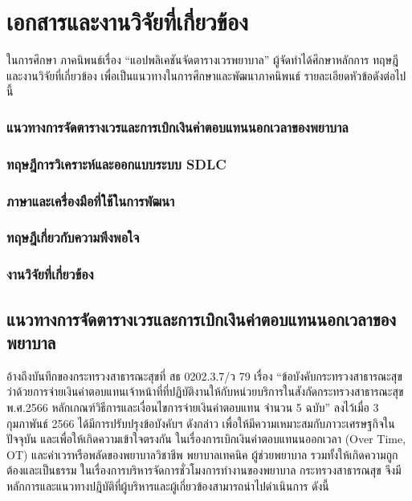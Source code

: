 \baselineskip=8mm
\chapter{เอกสารและงานวิจัยที่เกี่ยวข้อง}

\renewcommand{\thesubsection}{\arabic{subsection}.}
\renewcommand{\theequation}{\thesection.\arabic{equation}}
\renewcommand{\thesection}{}



ในการศึกษา ภาคนิพนธ์เรื่อง “แอปพลิเคชันจัดตารางเวรพยาบาล” ผู้จัดทำได้ศึกษาหลักการ ทฤษฎี และงานวิจัยที่เกี่ยวข้อง เพื่อเป็นแนวทางในการศึกษาและพัฒนาภาคนิพนธ์ รายละเอียดหัวข้อดังต่อไปนี้

\subsection{แนวทางการจัดตารางเวรและการเบิกเงินค่าตอบแทนนอกเวลาของพยาบาล}

\subsection{ทฤษฎีการวิเคราะห์และออกแบบระบบ SDLC}

\subsection{ภาษาและเครื่องมือที่ใช้ในการพัฒนา}

\subsection{ทฤษฎีเกี่ยวกับความพึงพอใจ}

\subsection{งานวิจัยที่เกี่ยวข้อง}

\clearpage

\section{แนวทางการจัดตารางเวรและการเบิกเงินค่าตอบแทนนอกเวลาของพยาบาล}

อ้างถึงบันทึกของกระทรวงสาธารณะสุขที่ สธ 0202.3.7/ว 79 เรื่อง “ข้อบังคับกระทรวงสาธารณะสุขว่าด้วยการจ่ายเงินค่าตอบแทนเจ้าหน้าที่ที่ปฏิบัติงานให้กับหน่วยบริการในสังกัดกระทรวงสาธารณะสุข พ.ศ.2566 หลักเกณฑ์วิธีการและเงื่อนไขการจ่ายเงินค่าตอบแทน จำนวน 5 ฉบับ” ลงไว้เมื่อ 3 กุมภาพันธ์ 2566 ได้มีการปรับปรุงข้อบังคับฯ ดังกล่าว เพื่อให้มีความเหมาะสมกับภาวะเศรษฐกิจในปัจจุบัน และเพื่อให้เกิดความเข้าใจตรงกัน ในเรื่องการเบิกเงินค่าตอบแทนนออกเวลา (Over Time, OT) และค่าเวรหรือพลัดของพยาบาลวิชาชีพ พยาบาลเทคนิค ผู้ช่วยพยาบาล รวมทั้งให้เกิดความถูกต้องและเป็นธรรม ในเรื่องการบริหารจัดการชั่วโมงการทำงานของพยาบาล กระทรวงสาธารณสุข จึงมีหลักการและแนวทางปฎิบัติที่ผู้บริหารและผู้เกี่ยวข้องสามารถนำไปดำเนินการ ดังนี้

